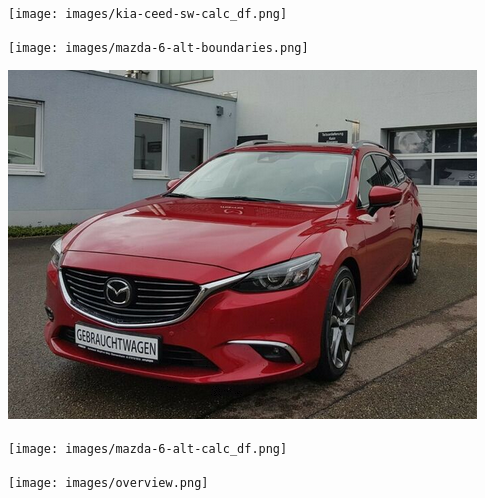 \documentclass[landscape, DIV=99]{scrartcl}
\begin{document}
\pagebreak

\onecolumn
\null
\vfill 
\begin{center}
\texttt{[image: images/kia-ceed-sw-calc\_df.png]}
\end{center}
\vfill 
    
\twocolumn
\null
\vfill 
\texttt{[image: images/mazda-6-alt-boundaries.png]}
\vfill 

\pagebreak

\null
\vfill 
\includegraphics[width=\columnwidth]{cars/mazda-6-alt.png}
\vfill 

\pagebreak

\onecolumn
\null
\vfill 
\begin{center}
\texttt{[image: images/mazda-6-alt-calc\_df.png]}
\end{center}
\vfill 
    

\pagebreak

\onecolumn
\null
\vfill 
\begin{center}
\texttt{[image: images/overview.png]}
\end{center}
\vfill 
\end{document}
